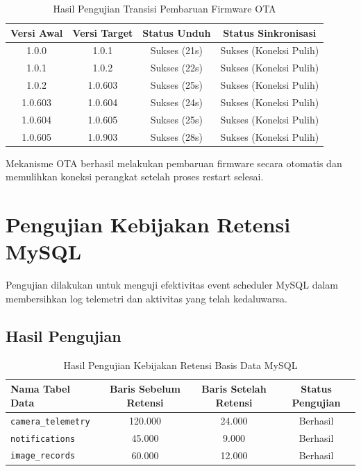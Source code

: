 \begin{table}[H]
	\centering
	\caption{Hasil Pengujian Transisi Pembaruan Firmware OTA}
	\begin{tabular}{|c|c|c|c|}
		\hline
		Versi Awal & Versi Target & Status Unduh & Status Sinkronisasi \\
		\hline
		1.0.0 & 1.0.1 & Sukses (21s) & Sukses (Koneksi Pulih) \\
		1.0.1 & 1.0.2 & Sukses (22s) & Sukses (Koneksi Pulih) \\
		1.0.2 & 1.0.603 & Sukses (25s) & Sukses (Koneksi Pulih) \\
		1.0.603 & 1.0.604 & Sukses (24s) & Sukses (Koneksi Pulih) \\
		1.0.604 & 1.0.605 & Sukses (25s) & Sukses (Koneksi Pulih) \\
		1.0.605 & 1.0.903 & Sukses (28s) & Sukses (Koneksi Pulih) \\
		\hline
	\end{tabular}
\end{table}

Mekanisme OTA berhasil melakukan pembaruan firmware secara otomatis dan memulihkan koneksi perangkat setelah proses restart selesai.

\section{Pengujian Kebijakan Retensi MySQL}

Pengujian dilakukan untuk menguji efektivitas event scheduler MySQL dalam membersihkan log telemetri dan aktivitas yang telah kedaluwarsa.

\subsection{Hasil Pengujian}

\begin{table}[H]
	\centering
	\caption{Hasil Pengujian Kebijakan Retensi Basis Data MySQL}
	\begin{tabular}{|l|c|c|c|}
		\hline
		Nama Tabel Data & Baris Sebelum Retensi & Baris Setelah Retensi & Status Pengujian \\
		\hline
		\texttt{camera\_telemetry} & 120.000 & 24.000 & Berhasil \\
		\texttt{notifications} & 45.000 & 9.000 & Berhasil \\
		\texttt{image\_records} & 60.000 & 12.000 & Berhasil \\
		\hline
	\end{tabular}
\end{table}

